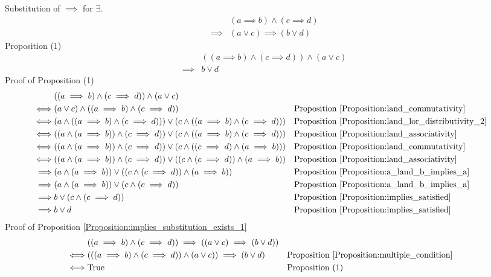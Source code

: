 \begin{prop}
\label{Proposition:implies_substitution_exists_1}
Substitution of $\implies$ for $\exists$.
\begin{align*}
& (a \implies b) \land (c \implies d) \\
\implies & (a \lor c) \implies (b \lor d)
\end{align*}
Proposition (1)
\begin{align*}
& ((a \implies b) \land (c \implies d)) \land (a \lor c) \\
\implies & b \lor d
\end{align*}
Proof of Proposition (1)
\begin{align*}
& ((a \implies b) \land (c \implies d)) \land (a \lor c) \\
\iff & (a \lor c) \land ((a \implies b) \land (c \implies d))
& & \text{Proposition \ref{Proposition:land_commutativity}} \\
\iff & (a \land ((a \implies b) \land (c \implies d))) \lor (c \land ((a \implies b) \land (c \implies d)))
& & \text{Proposition \ref{Proposition:land_lor_distributivity_2}} \\
\iff & ((a \land (a \implies b)) \land (c \implies d)) \lor (c \land ((a \implies b) \land (c \implies d)))
& & \text{Proposition \ref{Proposition:land_associativity}} \\
\iff & ((a \land (a \implies b)) \land (c \implies d)) \lor (c \land ((c \implies d) \land (a \implies b)))
& & \text{Proposition \ref{Proposition:land_commutativity}} \\
\iff & ((a \land (a \implies b)) \land (c \implies d)) \lor ((c \land (c \implies d)) \land (a \implies b))
& & \text{Proposition \ref{Proposition:land_associativity}} \\
\implies & (a \land (a \implies b)) \lor ((c \land (c \implies d)) \land (a \implies b))
& & \text{Proposition \ref{Proposition:a_land_b_implies_a}} \\
\implies & (a \land (a \implies b)) \lor (c \land (c \implies d))
& & \text{Proposition \ref{Proposition:a_land_b_implies_a}} \\
\implies & b \lor (c \land (c \implies d))
& & \text{Proposition \ref{Proposition:implies_satisfied}} \\
\implies & b \lor d
& & \text{Proposition \ref{Proposition:implies_satisfied}} \\
\end{align*}
Proof of Proposition \ref{Proposition:implies_substitution_exists_1}
\begin{align*}
& ((a \implies b) \land (c \implies d)) \implies ((a \lor c) \implies (b \lor d)) \\
\iff & (((a \implies b) \land (c \implies d)) \land (a \lor c)) \implies (b \lor d)
& & \text{Proposition \ref{Proposition:multiple_condition}} \\
\iff & \text{True}
& & \text{Proposition (1)} \\
\end{align*}
\end{prop}


